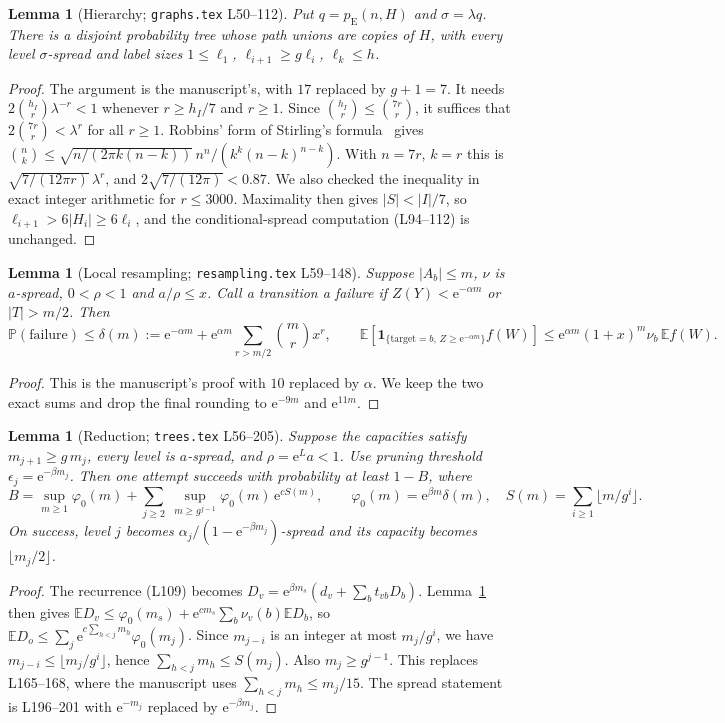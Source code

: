 \documentclass[11pt]{amsart}
\newtheorem{lemma}[theorem]{Lemma}
\theoremstyle{remark}
\newcommand{\PP}{\mathbb P}
\newcommand{\EE}{\mathbb E}
\newcommand{\pE}{p_{\mathrm E}}
\newcommand{\ee}{\mathrm e}
\begin{document}
\begin{lemma}[Hierarchy; \texttt{graphs.tex} L50--112]\label{lem:hier}
Put $q=\pE(n,H)$ and $\sigma=\lambda q$. There is a disjoint probability tree
whose path unions are copies of $H$, with every level $\sigma$-spread and
label sizes $1\le\ell_1$, $\ell_{i+1}\ge g\ell_i$, $\ell_k\le h$.
\end{lemma}
\begin{proof}
The argument is the manuscript's, with $17$ replaced by $g+1=7$. It needs
$2\binom{h_I}{r}\lambda^{-r}<1$ whenever $r\ge h_I/7$ and $r\ge1$. Since
$\binom{h_I}{r}\le\binom{7r}{r}$, it suffices that $2\binom{7r}{r}<\lambda^r$
for all $r\ge1$. Robbins' form of Stirling's formula~\cite{Robbins} gives
$\binom nk\le\sqrt{n/(2\pi k(n-k))}\,n^n/(k^k(n-k)^{n-k})$. With $n=7r$, $k=r$
this is $\sqrt{7/(12\pi r)}\,\lambda^r$, and $2\sqrt{7/(12\pi)}<0.87$. We also
checked the inequality in exact integer arithmetic for $r\le3000$.
Maximality then gives $|S|<|I|/7$, so $\ell_{i+1}>6|H_i|\ge6\ell_i$, and the
conditional-spread computation (L94--112) is unchanged.
\end{proof}

\begin{lemma}[Local resampling; \texttt{resampling.tex} L59--148]\label{lem:local}
Suppose $|A_b|\le m$, $\nu$ is $a$-spread, $0<\rho<1$ and $a/\rho\le x$. Call a transition a failure if
$Z(Y)<\ee^{-\alpha m}$ or $|T|>m/2$. Then
\[
\PP(\mathrm{failure})\le\delta(m):=\ee^{-\alpha m}+\ee^{\alpha m}\sum_{r>m/2}\binom mr x^r,
\qquad
\EE[\mathbf 1_{\{\mathrm{target}=b,\,Z\ge\ee^{-\alpha m}\}}f(W)]\le\ee^{\alpha m}(1+x)^m\nu_b\,\EE f(W).
\]
\end{lemma}
\begin{proof}
This is the manuscript's proof with $10$ replaced by $\alpha$. We keep the
two exact sums and drop the final rounding to $\ee^{-9m}$ and $\ee^{11m}$.
\end{proof}

\begin{lemma}[Reduction; \texttt{trees.tex} L56--205]\label{lem:red}
Suppose the capacities satisfy $m_{j+1}\ge g\,m_j$, every level is
$a$-spread, and $\rho=\ee^{L}a<1$. Use pruning threshold
$\epsilon_j=\ee^{-\beta m_j}$. Then one attempt succeeds with probability at
least $1-B$, where
\[
B=\sup_{m\ge1}\varphi_0(m)+\sum_{j\ge2}\ \sup_{m\ge g^{j-1}}\varphi_0(m)\,\ee^{cS(m)},\qquad
\varphi_0(m)=\ee^{\beta m}\delta(m),\quad S(m)=\sum_{i\ge1}\lfloor m/g^i\rfloor.
\]
On success, level $j$ becomes $\alpha_j/(1-\ee^{-\beta m_j})$-spread and its
capacity becomes $\lfloor m_j/2\rfloor$.
\end{lemma}
\begin{proof}
The recurrence (L109) becomes $D_v=\ee^{\beta m_s}(d_v+\sum_bt_{vb}D_b)$.
Lemma~\ref{lem:local} then gives
$\EE D_v\le\varphi_0(m_s)+\ee^{cm_s}\sum_b\nu_v(b)\EE D_b$, so
$\EE D_o\le\sum_j\ee^{c\sum_{h<j}m_h}\varphi_0(m_j)$. Since $m_{j-i}$ is an
integer at most $m_j/g^i$, we have $m_{j-i}\le\lfloor m_j/g^i\rfloor$, hence
$\sum_{h<j}m_h\le S(m_j)$. Also $m_j\ge g^{j-1}$. This replaces L165--168,
where the manuscript uses $\sum_{h<j}m_h\le m_j/15$. The spread statement is
L196--201 with $\ee^{-m_j}$ replaced by $\ee^{-\beta m_j}$.
\end{proof}
\end{document}
